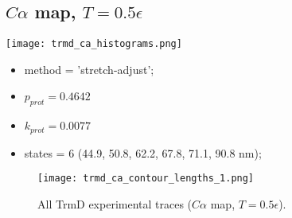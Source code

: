 \subsection{$C\alpha$ map, $T=0.5\epsilon$}
\label{subsec:trmd-ca}
\begin{minipage}[c]{0.7\textwidth}
    \texttt{[image: trmd\_ca\_histograms.png]}
\end{minipage}
\hfill
\begin{minipage}[c]{0.45\textwidth}
    \begin{itemize}
        \item method = 'stretch-adjust';
        \item $p_{prot}=0.4642$
        \item $k_{prot}=0.0077$
        \item states = 6 (44.9, 50.8, 62.2, 67.8, 71.1, 90.8 nm);
    \end{itemize}
\end{minipage}

\begin{figure}
    \centering
    \texttt{[image: trmd\_ca\_contour\_lengths\_1.png]}
    \caption{All TrmD experimental traces ($C\alpha$ map, $T=0.5\epsilon$).}
    \label{fig:trmd-ca-cl1}
\end{figure}

